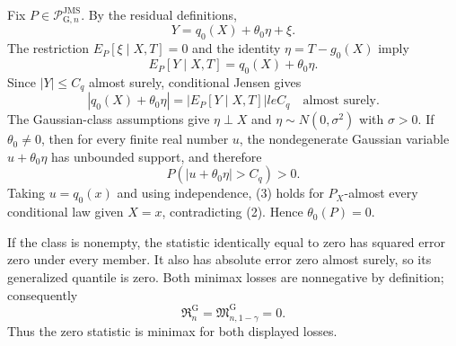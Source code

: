 Fix \(P\in\mathcal P_{\mathrm G,n}^{\mathrm{JMS}}\). By the residual definitions,
\[
 Y=q_0(X)+\theta_0\eta+\xi.
\]
The restriction \(E_P[\xi\mid X,T]=0\) and the identity \(\eta=T-g_0(X)\) imply
\[
 E_P[Y\mid X,T]=q_0(X)+\theta_0\eta. \tag{1}
\]
Since \(|Y|\le C_q\) almost surely, conditional Jensen gives
\[
 |q_0(X)+\theta_0\eta|
 =|E_P[Y\mid X,T]|le C_q
 \quad\text{almost surely}. \tag{2}
\]
The Gaussian-class assumptions give \(\eta\perp X\) and \(\eta\sim N(0,\sigma^2)\) with \(\sigma>0\). If \(\theta_0\ne0\), then for every finite real number \(u\), the nondegenerate Gaussian variable \(u+\theta_0\eta\) has unbounded support, and therefore
\[
 P(|u+\theta_0\eta|>C_q)>0. \tag{3}
\]
Taking \(u=q_0(x)\) and using independence, (3) holds for \(P_X\)-almost every conditional law given \(X=x\), contradicting (2). Hence \(\theta_0(P)=0\).

If the class is nonempty, the statistic identically equal to zero has squared error zero under every member. It also has absolute error zero almost surely, so its generalized quantile is zero. Both minimax losses are nonnegative by definition; consequently
\[
 \mathfrak R_n^{\mathrm G}
 =\mathfrak M_{n,1-\gamma}^{\mathrm G}=0.
\]
Thus the zero statistic is minimax for both displayed losses.